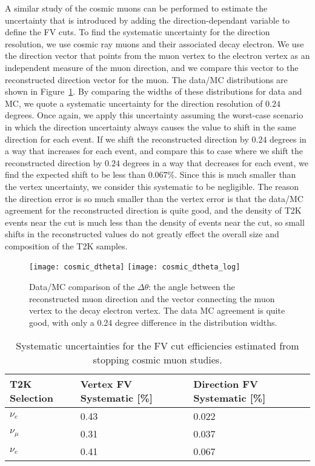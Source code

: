 A similar study of the cosmic muons can be performed to estimate the
uncertainty that is introduced by adding the direction-dependant \towall
variable to define the FV cuts.  To find the systematic uncertainty for the
direction resolution, we use cosmic ray muons and their associated decay
electron. We use the direction vector that points from the muon vertex to the
electron vertex as an independent measure of the muon direction, and we compare
this vector to the reconstructed direction vector for the muon.  The data/MC
distributions are shown in Figure~\ref{fig:dirres}.  By comparing the widths of
these distributions for data and MC, we quote a systematic uncertainty for the
direction resolution of $0.24$ degrees.  Once again, we apply this uncertainty
assuming the worst-case scenario in which the direction uncertainty always
causes the \towall value to shift in the same direction for each event.  If we
shift the reconstructed direction by $0.24$ degrees in a way that increases
\towall for each event, and compare this to case where we shift the
reconstructed direction by $0.24$ degrees in a way that decreases \towall for
each event, we find the expected shift to be less than $0.067\%$.  Since this
is much smaller than the vertex uncertainty, we consider this systematic to be
negligible.  The reason the direction error is so much smaller than the vertex
error is that the data/MC agreement for the reconstructed direction is quite
good, and the density of T2K events near the \towall cut is much less than the
density of events near the \wall cut, so small shifts in the reconstructed
\towall values do not greatly effect the overall size and composition of the T2K
samples.

\begin{figure}[h]
  \begin{center}
    \texttt{[image: cosmic\_dtheta]}
    \texttt{[image: cosmic\_dtheta\_log]}
  \end{center}
  \caption{Data/MC comparison of the $\Delta \theta$: the angle between the
  reconstructed muon direction and the vector connecting the muon vertex to the
  decay electron vertex.  The data MC agreement is quite good, with only a 0.24
  degree difference in the distribution widths.}
  \label{fig:dirres}
\end{figure}

\begin{table}
  \centering
  \begin{tabular}{l | l | l}
    \hline\hline
    T2K Selection & Vertex FV Systematic [\%] & Direction FV Systematic [\%] \\
    \hline
    $\nu_{e}$ & 0.43 & 0.022\\
    $\nu_{\mu}$ & 0.31 & 0.037 \\
    $\nu_{e}$ & 0.41 & 0.067 \\
    \hline
  \end{tabular}
  \caption{Systematic uncertainties for the FV cut efficiencies estimated from
  stopping cosmic muon studies.}
  \label{tab:fverr}
\end{table}


